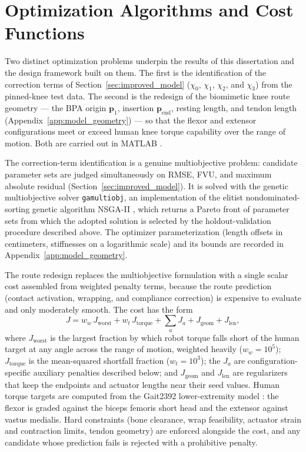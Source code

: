 \section{Optimization Algorithms and Cost Functions}\label{sec:optimization}

Two distinct optimization problems underpin the results of this dissertation and the design framework built on them. The first is the identification of the correction terms of Section~\ref{sec:improved_model} ($\chi_{0}$, $\chi_{1}$, $\chi_{2}$, and $\chi_{3}$) from the pinned-knee test data. The second is the redesign of the biomimetic knee route geometry --- the BPA origin $\mathbf{p}_{1}$, insertion $\mathbf{p}_{\text{end}}$, resting length, and tendon length (Appendix~\ref{app:model_geometry}) --- so that the flexor and extensor configurations meet or exceed human knee torque capability over the range of motion. Both are carried out in MATLAB \citep{mathworks_optimization_2025}.

The correction-term identification is a genuine multiobjective problem: candidate parameter sets are judged simultaneously on RMSE, FVU, and maximum absolute residual (Section~\ref{sec:improved_model}). It is solved with the genetic multiobjective solver \texttt{gamultiobj}, an implementation of the elitist nondominated-sorting genetic algorithm NSGA-II \citep{deb_nsga2_2002, mathworks_optimization_2025}, which returns a Pareto front of parameter sets from which the adopted solution is selected by the holdout-validation procedure described above. The optimizer parameterization (length offsets in centimeters, stiffnesses on a logarithmic scale) and its bounds are recorded in Appendix~\ref{app:model_geometry}.

The route redesign replaces the multiobjective formulation with a single scalar cost assembled from weighted penalty terms, because the route prediction (contact activation, wrapping, and compliance correction) is expensive to evaluate and only moderately smooth. The cost has the form
\begin{equation}
    J = w_{w}\,J_{\text{worst}} + w_{t}\,J_{\text{torque}} + \textstyle\sum_{a} J_{a} + J_{\text{geom}} + J_{\text{len}},
    \label{eq:opt_cost}
\end{equation}
where $J_{\text{worst}}$ is the largest fraction by which robot torque falls short of the human target at any angle across the range of motion, weighted heavily ($w_{w} = 10^{5}$); $J_{\text{torque}}$ is the mean-squared shortfall fraction ($w_{t} = 10^{3}$); the $J_{a}$ are configuration-specific auxiliary penalties described below; and $J_{\text{geom}}$ and $J_{\text{len}}$ are regularizers that keep the endpoints and actuator lengths near their seed values. Human torque targets are computed from the Gait2392 lower-extremity model \citep{delp_opensim_2007, seth_opensim_2018}: the flexor is graded against the biceps femoris short head and the extensor against vastus medialis. Hard constraints (bone clearance, wrap feasibility, actuator strain and contraction limits, tendon geometry) are enforced alongside the cost, and any candidate whose prediction fails is rejected with a prohibitive penalty.

